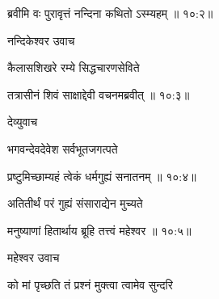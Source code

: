 {\devanagarifont ब्रवीमि वः पुरावृत्तं नन्दिना कथितो ऽस्म्यहम् {॥ १०:२॥} \veg\dontdisplaylinenum }%

{\devanagarifont नन्दिकेश्वर उवाच {\dandab}\dontdisplaylinenum  }%

{\devanagarifont कैलासशिखरे रम्ये सिद्धचारणसेविते \thinspace{\danda} \dontdisplaylinenum }%


{\devanagarifont तत्रासीनं शिवं साक्षाद्देवी वचनमब्रवीत् {॥ १०:३॥} \veg\dontdisplaylinenum }%
 
{\devanagarifont देव्युवाच {\dandab}\dontdisplaylinenum  }%
 
{\devanagarifont भगवन्देवदेवेश सर्वभूतजगत्पते \thinspace{\danda} \dontdisplaylinenum }%


{\devanagarifont प्रष्टुमिच्छाम्यहं त्वेकं धर्मगुह्यं सनातनम् {॥ १०:४॥} \veg\dontdisplaylinenum }%

{\devanagarifont अतितीर्थं परं गुह्यं संसाराद्येन मुच्यते \thinspace{\dandab} \dontdisplaylinenum }%


{\devanagarifont मनुष्याणां हितार्थाय ब्रूहि तत्त्वं महेश्वर {॥ १०:५॥} \veg\dontdisplaylinenum }%

{\devanagarifont महेश्वर उवाच {\dandab}\dontdisplaylinenum  }%
 
{\devanagarifont को मां पृच्छति तं प्रश्नं मुक्त्वा त्वामेव सुन्दरि \thinspace{\danda} \dontdisplaylinenum }%

